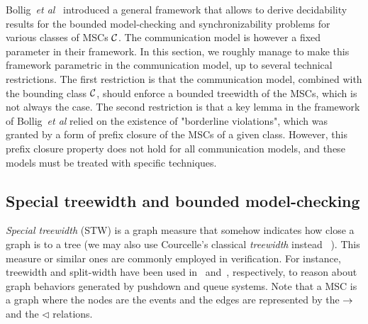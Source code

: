 Bollig~\emph{et al}~\cite{BolligGFLLS21} introduced a general framework that allows to derive decidability results 
for the bounded model-checking and synchronizability problems
for various classes of MSCs $\mathcal{C}$. The communication model is however a fixed parameter
in their framework.
In this section, we roughly manage to make this framework parametric in the communication
model, up to several technical restrictions. The first restriction is that the communication
model, combined with the bounding class $\mathcal{C}$, should enforce a bounded treewidth of the
MSCs, which is not always the case. The second restriction is that a key lemma in the framework
of  Bollig~\emph{et al} relied on the existence of "borderline violations", which was granted
by a form of prefix closure of the MSCs of a given class. However, this prefix closure property
does not hold for all communication models, and these models must be treated with specific
techniques.

\subsection{Special treewidth and bounded model-checking\label{sec:stw}}

\emph{Special treewidth} (STW)
is a graph measure that somehow indicates how close
a graph is to a tree (we may also use Courcelle's classical \emph{treewidth} instead~ \cite{Courcelle10}).
This measure or similar ones are commonly employed in verification. For instance, treewidth and split-width have been used in~\cite{MadhusudanP11} and~\cite{DBLP:conf/concur/CyriacGK12,AiswaryaGK14}, respectively, to reason about graph behaviors generated by pushdown and queue systems.
Note that a MSC is a graph where the nodes are the events and the edges are represented by the $\to$ and the $\lhd$ relations.


